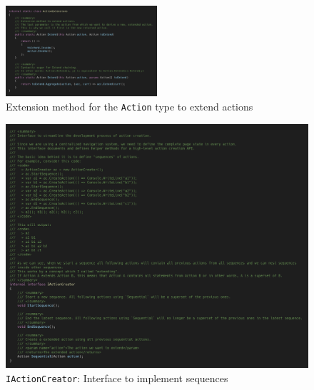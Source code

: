 \begin{figure}
\centering
\caption[Extending \texttt{Action} type]{Extension method for the \texttt{Action} type to extend actions}
\label{fig:navsystem.sequences.extension}
\includegraphics[width=0.5\textwidth]{figures/code/nav-arch/action-extensions.png}
\end{figure}

\begin{figure}
\centering
\caption[Sequence interface implementation]{\texttt{IActionCreator}: Interface to implement sequences}
\label{fig:navsystem.iactioncreator}
\includegraphics[width=\textwidth]{figures/code/nav-arch/IActionCreator-full.png}
\end{figure}

